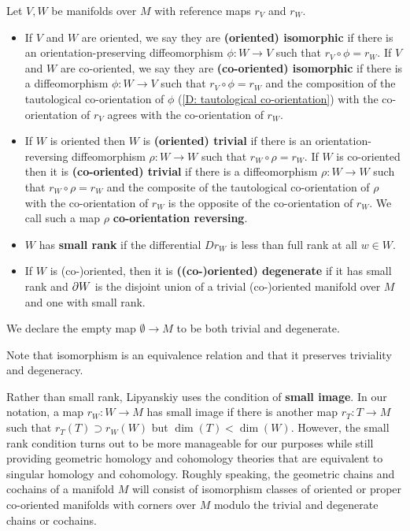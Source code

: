 \begin{definition}\label{D: equiv triv and small}
	Let $V, W$ be manifolds over $M$ with reference maps $r_V$ and $r_W$.
	\begin{itemize}
		\item If $V$ and $W$ are oriented, we say they are \textbf{(oriented) isomorphic} if there is an orientation-preserving diffeomorphism $\phi \colon W \to V$ such that $r_V \circ \phi = r_W$.
		If $V$ and $W$ are co-oriented, we say they are \textbf{(co-oriented) isomorphic} if there is a diffeomorphism $\phi \colon W \to V$ such that $r_V \circ \phi = r_W$ and the composition of the
		tautological co-orientation of $\phi$ (\cref{D: tautological co-orientation}) with the co-orientation of $r_V$ agrees with the co-orientation of $r_W$.

		\item If $W$ is oriented then $W$ is \textbf{(oriented) trivial} if there is an orientation-reversing diffeomorphism $\rho \colon W \to W$ such that $r_W \circ \rho = r_W$.
		If $W$ is co-oriented then it is \textbf{(co-oriented) trivial} if there is a diffeomorphism $\rho \colon W \to W$ such that $r_W \circ \rho = r_W$ and the composite of the tautological co-orientation of $\rho$ with the co-orientation of $r_W$ is the opposite of the co-orientation of $r_W$.
		We call such a map $\rho$ \textbf{co-orientation reversing}.

		\item $W$ has \textbf{small rank} if the differential $D r_W$ is less than full rank at all $w\in W$.

		\item If $W$ is (co-)oriented, then it is \textbf{((co-)oriented) degenerate} if it has small rank and ${\partial W}$ is the disjoint union of a trivial (co-)oriented manifold over $M$ and one with small rank.
	\end{itemize}
	We declare the empty map $\emptyset \to M$ to be both trivial and degenerate.
\end{definition}

Note that isomorphism is an equivalence relation and that it preserves triviality and degeneracy.

Rather than small rank, Lipyanskiy uses the condition of \textbf{small image}.
In our notation, a map $r_W \colon W \to M$ has small image if there is another map $r_T \colon T \to M$ such that $r_T(T)\supset r_W(W)$ but $\dim(T)<\dim(W)$.
However, the small rank condition turns out to be more manageable for our purposes while still providing geometric homology and cohomology theories that are equivalent to singular homology and cohomology.
Roughly speaking, the geometric chains and cochains of a manifold $M$ will consist of isomorphism classes of oriented or proper co-oriented manifolds with corners over $M$ modulo the trivial and degenerate chains or cochains.

